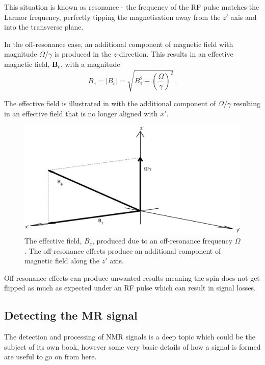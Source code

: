 This situation is known as resonance - the frequency of the \ac{RF} pulse matches the Larmor frequency, perfectly tipping the magnetisation away from the $z'$ axis and into the transverse plane. 

In the off-resonance case, an additional component of magnetic field with magnitude $\Omega/\gamma$ is produced in the $z$-direction.
This results in an effective magnetic field, $\mathbf{B}_e$, with a magnitude \cite{DeGraaf2007}
\begin{equation}
	B_e = |B_e| = \sqrt{B_1^2 + \left(\frac{\Omega}{\gamma}\right)^2}\,.
	\label{eq:Beff}
\end{equation}

The effective field is illustrated in  with the additional component of $\Omega/\gamma$ resulting in an effective field that is no longer aligned with $x'$.
\begin{figure}
	\centering
	\includegraphics[width=\textwidth]{figures/background/B_e.eps}
	\caption[The effective field, $B_e$, produced due to an off-resonance frequency $\Omega$.] {The effective field, $B_e$, produced due to an off-resonance frequency $\Omega$. The off-resonance effects produce an additional component of magnetic field along the $z'$ axis.}
	\label{fig:B_e}	
\end{figure}
Off-resonance effects can produce unwanted results meaning the spin does not get flipped as much as expected under an \ac{RF} pulse which can result in signal losses. 
 

\subsection{Detecting the MR signal}
The detection and processing of \ac{NMR} signals is a deep topic which could be the subject of its own book, however some very basic details of how a signal is formed are useful to go on from here.
 
